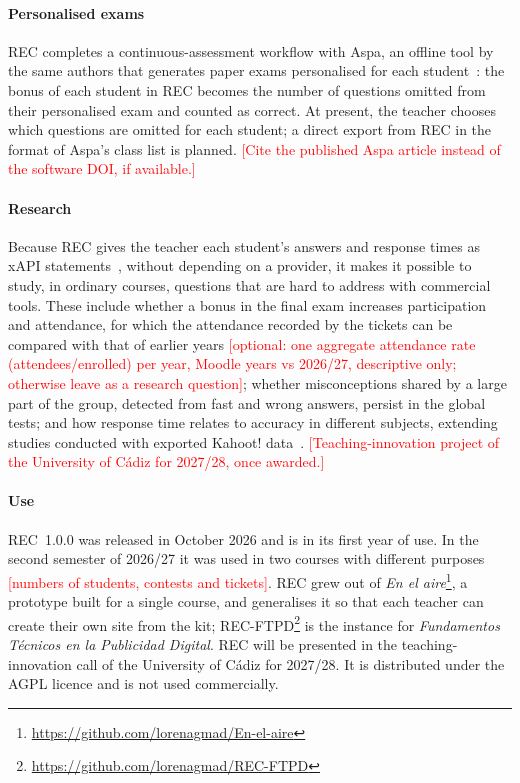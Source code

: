 \documentclass[preprint,12pt, a4paper]{elsarticle}
\newcommand{\todo}[1]{\textcolor{red}{[#1]}}
\begin{document}
\paragraph{Personalised exams} REC completes a continuous-assessment workflow with Aspa, an offline tool by the same authors that generates paper exams personalised for each student~\cite{aspa}: the bonus of each student in REC becomes the number of questions omitted from their personalised exam and counted as correct. At present, the teacher chooses which questions are omitted for each student; a direct export from REC in the format of Aspa's class list is planned. \todo{Cite the published Aspa article instead of the software DOI, if available.}

\paragraph{Research} Because REC gives the teacher each student's answers and response times as xAPI statements~\cite{xapi,serrano2017}, without depending on a provider, it makes it possible to study, in ordinary courses, questions that are hard to address with commercial tools. These include whether a bonus in the final exam increases participation and attendance, for which the attendance recorded by the tickets can be compared with that of earlier years \todo{optional: one aggregate attendance rate (attendees/enrolled) per year, Moodle years vs 2026/27, descriptive only; otherwise leave as a research question}; whether misconceptions shared by a large part of the group, detected from fast and wrong answers, persist in the global tests; and how response time relates to accuracy in different subjects, extending studies conducted with exported Kahoot! data~\cite{liang2024}. \todo{Teaching-innovation project of the University of Cádiz for 2027/28, once awarded.}

\paragraph{Use} REC~1.0.0 was released in October 2026 and is in its first year of use. In the second semester of 2026/27 it was used in two courses with different purposes \todo{numbers of students, contests and tickets}. REC grew out of \emph{En el aire}\footnote{\url{https://github.com/lorenagmad/En-el-aire}}, a prototype built for a single course, and generalises it so that each teacher can create their own site from the kit; REC-FTPD\footnote{\url{https://github.com/lorenagmad/REC-FTPD}} is the instance for \emph{Fundamentos Técnicos en la Publicidad Digital}. REC will be presented in the teaching-innovation call of the University of Cádiz for 2027/28. It is distributed under the AGPL licence and is not used commercially.
\end{document}
